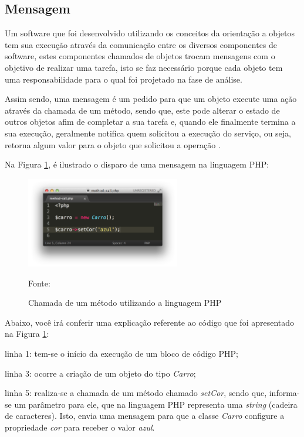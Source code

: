 \subsection{Mensagem}

Um software que foi desenvolvido utilizando os conceitos da orientação a
objetos tem sua execução através da comunicação entre os diversos componentes
de software, estes componentes chamados de objetos trocam mensagens com o
objetivo de realizar uma tarefa, isto se faz necessário porque cada objeto  tem
uma responsabilidade para o qual foi projetado na fase de análise.

Assim sendo, uma mensagem é um pedido para que um objeto execute uma ação
através da chamada de um método, sendo que, este pode alterar o estado de
outros objetos afim de completar a sua tarefa e, quando ele finalmente termina
a sua execução, geralmente notifica quem solicitou a execução do serviço, ou
seja, retorna algum valor para o objeto que solicitou a operação
\cite{c++ComoProgramar}.

Na Figura \ref{fig:mensagem}, é ilustrado o disparo de uma mensagem na linguagem
\acs{PHP}:

\begin{figure}[h!tb]
	\caption{Chamada de um método utilizando a linguagem PHP}
	\label{fig:mensagem}

	\centering
	\includegraphics[width=0.6\textwidth]{images/method-call.png}

	\centering
	\footnotesize Fonte: \fonteOAutor
\end{figure}

\FloatBarrier 	%

Abaixo, você irá conferir uma explicação referente ao código que foi
apresentado na Figura \ref{fig:mensagem}:

\begin{alineas}
    \item linha 1: tem-se o início da execução de um bloco de código
    \acs{PHP};
    \item linha 3: ocorre a criação de um objeto do tipo \textit{Carro};
    \item linha 5: realiza-se a chamada de um método chamado
    \textit{setCor}, sendo que, informa-se um parâmetro para ele, que na
    linguagem \acs{PHP} representa uma \textit{string} (cadeira de caracteres).
    Isto, envia uma mensagem para que a classe \textit{Carro} configure
    a propriedade \textit{cor} para receber o valor \textit{azul}.
\end{alineas}

